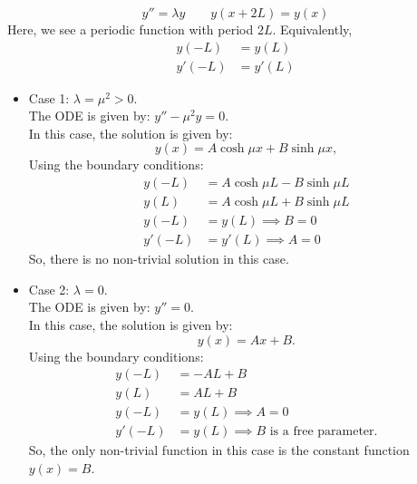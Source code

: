 \begin{eg}\label{eg:bvpmotiv2}
	\[
	y'' = \lambda y \qquad y(x+2L) = y(x)
	\]
	Here, we see a periodic function with period $2L$. Equivalently,
	\begin{align*}
		y(-L) &= y(L) \\
		y'(-L) &= y'(L)
	\end{align*}
	\begin{itemize}
		\item Case 1: $\lambda = \mu^2 > 0$.\\
		The ODE is given by: $y'' - \mu^2 y = 0$.\\
		In this case, the solution is given by:
		\[
		y(x) = A \cosh{\mu x} + B \sinh{\mu x},
		\]
		Using the boundary conditions:
		\begin{align*}
			y(-L) &= A \cosh{\mu L} - B \sinh{\mu L} \\
			y(L) &= A \cosh{\mu L} + B \sinh{\mu L} \\
			y(-L) &= y(L) \implies B = 0 \\
			y'(-L) &= y'(L) \implies A = 0 
		\end{align*}
		So, there is no non-trivial solution in this case.
		
		\item Case 2: $\lambda = 0$.\\
		The ODE is given by: $y''= 0$.\\
		In this case, the solution is given by:
		\[
		y(x) = Ax + B.
		\]
		Using the boundary conditions:
		\begin{align*}
			y(-L) &= -AL + B\\
			y(L) &= AL + B \\
			y(-L) &= y(L) \implies A = 0 \\
			y'(-L) &= y(L) \implies B \text{ is a free parameter.}
		\end{align*}
		So, the only non-trivial function in this case is the constant function $y(x)=B$.
		

\end{itemize}
\end{eg}
